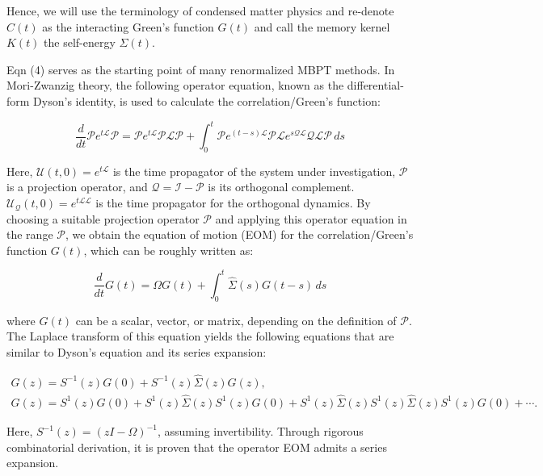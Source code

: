 \documentclass[12pt]{article}
\begin{document}
Hence, we will use the terminology of condensed matter physics and re-denote \( C(t) \) as the interacting Green’s function \( G(t) \) and call the memory kernel \( K(t) \) the self-energy \( \Sigma(t) \).

Eqn (4) serves as the starting point of many renormalized MBPT methods. In Mori-Zwanzig theory, the following operator equation, known as the differential-form Dyson's identity, is used to calculate the correlation/Green's function:

\begin{equation}
\frac{d}{d t} \mathcal{P} e^{t \mathcal{L}} \mathcal{P}=\mathcal{P} e^{t \mathcal{L}} \mathcal{P} \mathcal{L} \mathcal{P}+\int_0^t \mathcal{P} e^{(t-s) \mathcal{L}} \mathcal{P} \mathcal{L} e^{s \mathcal{Q} \mathcal{L}} \mathcal{Q L} \mathcal{P} \, ds
\end{equation}

Here, \( \mathcal{U}(t, 0)=e^{t \mathcal{L}} \) is the time propagator of the system under investigation, \( \mathcal{P} \) is a projection operator, and \( \mathcal{Q}=\mathcal{I}-\mathcal{P} \) is its orthogonal complement. \( \mathcal{U}_{\mathcal{Q}}(t, 0)=e^{t \mathcal{L} \mathcal{L}} \) is the time propagator for the orthogonal dynamics. By choosing a suitable projection operator \( \mathcal{P} \) and applying this operator equation in the range \( \mathcal{P} \), we obtain the equation of motion (EOM) for the correlation/Green's function \( G(t) \), which can be roughly written as:

\begin{equation}
\frac{d}{d t} G(t)=\Omega G(t)+\int_0^t \hat{\Sigma}(s) G(t-s) \, ds
\end{equation}

where \( G(t) \) can be a scalar, vector, or matrix, depending on the definition of \( \mathcal{P} \). The Laplace transform of this equation yields the following equations that are similar to Dyson's equation and its series expansion:

\begin{gather}
G(z)=S^{-1}(z) G(0)+S^{-1}(z) \hat{\Sigma}(z) G(z), \\
G(z)=S^1(z) G(0)+S^1(z) \hat{\Sigma}(z) S^1(z) G(0)+S^1(z) \hat{\Sigma}(z) S^1(z) \hat{\Sigma}(z) S^1(z) G(0)+\cdots.
\end{gather}

Here, \( S^{-1}(z)=(z I-\Omega)^{-1} \), assuming invertibility. Through rigorous combinatorial derivation, it is proven that the operator EOM admits a series expansion.
\end{document}
